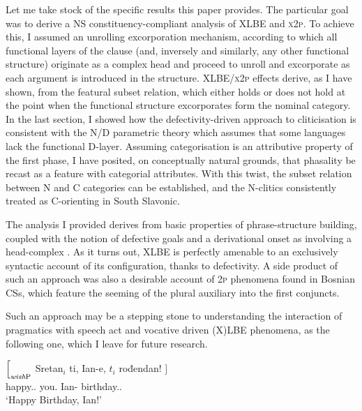 \documentclass[output=paper]{langsci/langscibook}
\begin{document}
Let me take stock of the specific results this paper provides. The particular
goal was to derive a NS constituency-com\-pli\-ant analysis of XLBE and
\textsc{x2p}. To achieve this, I assumed an unrolling excorporation mechanism,
according to which all functional layers of the clause (and, inversely and
similarly, any other functional structure) originate as a complex head and
proceed to unroll and excorporate as each argument is introduced in the
structure. XLBE/\textsc{x2p} effects derive, as I have shown, from the featural
subset relation, which either holds or does not hold at the point when the
functional structure excorporates form the nominal category. In the last
section, I showed how the defectivity-driven approach to
cliticisation is consistent with the N/D parametric theory which
assumes that some languages lack the functional D-layer. Assuming
categorisation is an attributive property of the first phase, I have
posited, on conceptually natural grounds, that phasality be recast as a feature
with categorial attributes. With this twist, the subset relation between N and
C categories can be established, and the N-clitics consistently treated as
C-orienting in South Slavonic.

The analysis I provided derives from basic properties of phrase-structure
building, coupled with the notion of defective goals and a derivational onset
as involving a head-complex \citep{Shimada:2007}. As it turns out, XLBE is
perfectly amenable to an exclusively syntactic account of its configuration,
thanks to  defectivity. A side product of such an
approach was also a desirable account of \textsc{2p} phenomena found in Bosnian
CSs, which feature the seeming  of the plural
auxiliary into the first conjuncts.

Such an approach may be a stepping stone to understanding the interaction of
pragmatics with speech act and vocative driven (X)LBE phenomena, as the
following one, which I leave for future research.

\begin{exe}
	\ex \gll $\Big[_{\emph{wish}\textup{P}}$ Sretan$_i$ ti, Ian-e, $t_i$ rođendan! $\Big]$ \\
    {}	happy.\M.\Sg{} you.\Dat{} Ian-\Voc{} {} birthday.\M.\Sg{} \\
    \trans	`Happy Birthday, Ian!'
\end{exe}

\printchapterglossary{}

{\sloppy\printbibliography[heading=subbibliography,notkeyword=this]}
\end{document}
